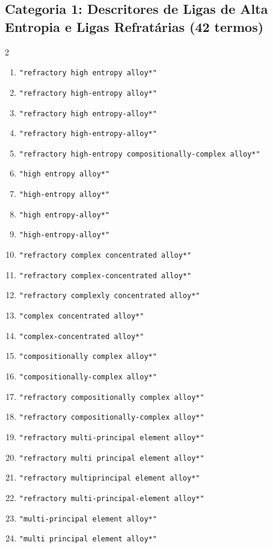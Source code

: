 \subsection*{Categoria 1: Descritores de Ligas de Alta Entropia e Ligas Refratárias (42 termos)}
\begin{multicols}{2}
\begin{enumerate}\footnotesize\itemsep=1pt\parsep=0pt
  \item \texttt{"refractory high entropy alloy*"}
  \item \texttt{"refractory high-entropy alloy*"}
  \item \texttt{"refractory high entropy-alloy*"}
  \item \texttt{"refractory high-entropy-alloy*"}
  \item \texttt{"refractory high-entropy compositionally-complex alloy*"}
  \item \texttt{"high entropy alloy*"}
  \item \texttt{"high-entropy alloy*"}
  \item \texttt{"high entropy-alloy*"}
  \item \texttt{"high-entropy-alloy*"}
  \item \texttt{"refractory complex concentrated alloy*"}
  \item \texttt{"refractory complex-concentrated alloy*"}
  \item \texttt{"refractory complexly concentrated alloy*"}
  \item \texttt{"complex concentrated alloy*"}
  \item \texttt{"complex-concentrated alloy*"}
  \item \texttt{"compositionally complex alloy*"}
  \item \texttt{"compositionally-complex alloy*"}
  \item \texttt{"refractory compositionally complex alloy*"}
  \item \texttt{"refractory compositionally-complex alloy*"}
  \item \texttt{"refractory multi-principal element alloy*"}
  \item \texttt{"refractory multi principal element alloy*"}
  \item \texttt{"refractory multiprincipal element alloy*"}
  \item \texttt{"refractory multi-principal-element alloy*"}
  \item \texttt{"multi-principal element alloy*"}
  \item \texttt{"multi principal element alloy*"}

\end{enumerate}
\end{multicols}
